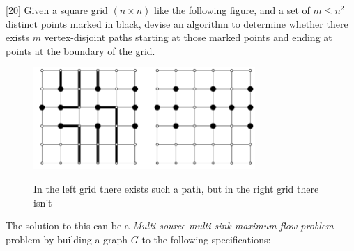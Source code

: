 \documentclass[addpoints]{exam}
\begin{document}
\begin{questions}
\begin{parts}
\begin{solution}
\end{solution}
\end{parts}

[20]
Given a square grid $(n\times n)$ like the following figure, and a set of $m
\leq n^{2}$ distinct points marked in black, devise an algorithm to
determine whether there exists $m$ vertex-disjoint paths starting at
those marked points and ending at points at the boundary of the grid.

\begin{figure}[H]
  \centering
  \includegraphics[width=0.75\textwidth]{grid.png}\\
  \caption{In the left grid there exists such a path, but in the right
  grid there isn't}
\end{figure}

\begin{solution}


The solution to this can be a {\em Multi-source multi-sink maximum flow problem} \cite{wiki-Multi} problem by building a graph $G$ to the following specifications:


\end{solution}
\end{questions}
\end{document}
